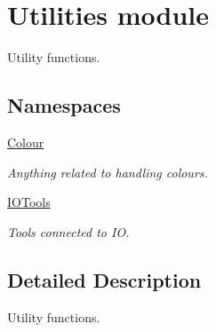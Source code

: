 \hypertarget{group__utils}{}\section{Utilities module}
\label{group__utils}


Utility functions.  


\subsection*{Namespaces}
\begin{DoxyCompactItemize}
\item 
 \mbox{\hyperlink{namespaceColour}{Colour}}
\begin{DoxyCompactList}\small\item\em Anything related to handling colours. \end{DoxyCompactList}\item 
 \mbox{\hyperlink{namespaceIOTools}{I\+O\+Tools}}
\begin{DoxyCompactList}\small\item\em Tools connected to IO. \end{DoxyCompactList}\end{DoxyCompactItemize}


\subsection{Detailed Description}
Utility functions. 

